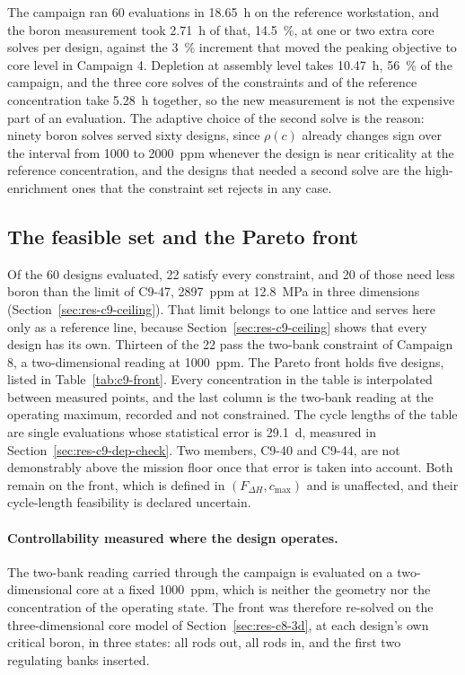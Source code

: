 The campaign ran 60 evaluations in \SI{18.65}{h} on the reference
workstation, and the boron measurement took \SI{2.71}{h} of that,
\SI{14.5}{\%}, at one or two extra core solves per design, against the
\SI{3}{\%} increment that moved the peaking objective to core level in
Campaign 4. Depletion at assembly level takes \SI{10.47}{h}, \SI{56}{\%}
of the campaign, and the three core solves of the constraints and of the
reference concentration take \SI{5.28}{h} together, so the new
measurement is not the expensive part of an evaluation. The adaptive
choice of the second solve is the reason: ninety boron solves served
sixty designs, since $\rho(c)$ already changes sign over the interval
from 1000 to \SI{2000}{ppm} whenever the design is near criticality at
the reference concentration, and the designs that
needed a second solve are the high-enrichment ones that the constraint
set rejects in any case.

\subsection{The feasible set and the Pareto front}
\label{sec:res-c9-front}

Of the 60 designs evaluated, 22 satisfy every constraint, and 20 of those
need less boron than the limit of C9-47, \SI{2897}{ppm} at
\SI{12.8}{MPa} in three dimensions (Section~\ref{sec:res-c9-ceiling}).
That limit belongs to one lattice and serves here only as a reference
line, because Section~\ref{sec:res-c9-ceiling} shows that every design has
its own. Thirteen of the 22 pass the two-bank constraint of Campaign 8, a
two-dimensional reading at \SI{1000}{ppm}. The Pareto front holds five
designs, listed in Table~\ref{tab:c9-front}. Every concentration in the
table is interpolated between measured points, and the last column is the
two-bank reading at the operating maximum, recorded and not constrained.
The cycle lengths of the table are single evaluations whose statistical
error is \SI{29.1}{d}, measured in
Section~\ref{sec:res-c9-dep-check}. Two members, C9-40 and C9-44, are not
demonstrably above the mission floor once that error is taken into
account. Both remain on the front, which is defined in
$(F_{\Delta H}, c_\mathrm{max})$ and is unaffected, and their
cycle-length feasibility is declared uncertain.

\paragraph{Controllability measured where the design operates.}
The two-bank reading carried through the campaign is evaluated on a
two-dimensional core at a fixed \SI{1000}{ppm}, which is neither the
geometry nor the concentration of the operating state. The front was
therefore re-solved on the three-dimensional core model of Section~\ref{sec:res-c8-3d},
at each design's own critical boron, in three states: all rods out, all
rods in, and the first two regulating banks inserted.

